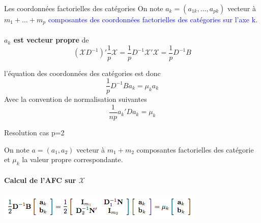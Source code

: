 \documentclass[10pt]{beamer}
\begin{document}
\begin{frame}{Les coordonnées factorielles des catégories}
\centering 
 On note $a_k = (a_{1k}, \ldots , a_{pk})$ vecteur à $m_1 + \ldots + m_p$ \textcolor{blue}{composantes des coordonnées factorielles des catégories sur l'axe k}. \\~\\
 
 
\textbf{$a_k$ est vecteur propre} de $$(\mathcal{X}D^{-1})' \frac{1}{p} \mathcal{X}=\frac{1}{p}{D^{-1}} \mathcal{X}' \mathcal{X}=  \frac{1}{p}{D^{-1}} B$$ 

l’équation des coordonnées des catégories est donc 
 $$\frac{1}{p}{D^{-1}} Ba_k=\mu_k a_k  $$ 
 Avec la convention de normalisation suivantes
  $$\frac{1}{np} {a_k}'Da_k=\mu_k   $$ 

 
 
\end{frame}



\begin{frame}{Resolution cas p=2}
 
\centering 

 On note $a = (a_{1},  a_{2})$ vecteur à $m_1 +  m_2$ composantes   factorielles des catégorie et $\mu_k$ la valeur propre correspondante. \\ \ \\
 

 
 \textbf{Calcul de l'AFC sur $\mathcal{X}$}\\ \ \\
 
 
  \includegraphics[scale=0.8]{AFC1} 
  
 
\end{frame}


\end{document}
